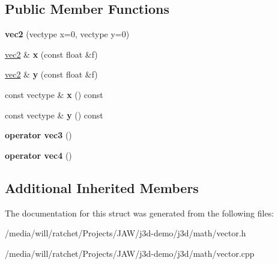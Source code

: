 \subsection*{Public Member Functions}
\begin{DoxyCompactItemize}
\item 
\hypertarget{structj3d_1_1vec2_ae8532d748f0c45ba9d535205c7c6b695}{}{\bfseries vec2} (vectype x=0, vectype y=0)\label{structj3d_1_1vec2_ae8532d748f0c45ba9d535205c7c6b695}

\item 
\hypertarget{structj3d_1_1vec2_a1f2c1957d2b8a6b29d866e56cae11551}{}\hyperlink{structj3d_1_1vec2}{vec2} \& {\bfseries x} (const float \&f)\label{structj3d_1_1vec2_a1f2c1957d2b8a6b29d866e56cae11551}

\item 
\hypertarget{structj3d_1_1vec2_af2b7b7337bdf7d0ed7e2a1eda2b17b0d}{}\hyperlink{structj3d_1_1vec2}{vec2} \& {\bfseries y} (const float \&f)\label{structj3d_1_1vec2_af2b7b7337bdf7d0ed7e2a1eda2b17b0d}

\item 
\hypertarget{structj3d_1_1vec2_ae1d8cd2a732b0b452ea4ffb43d15e3f1}{}const vectype \& {\bfseries x} () const \label{structj3d_1_1vec2_ae1d8cd2a732b0b452ea4ffb43d15e3f1}

\item 
\hypertarget{structj3d_1_1vec2_a6121dc1f7b29bc995a82eef739c29793}{}const vectype \& {\bfseries y} () const \label{structj3d_1_1vec2_a6121dc1f7b29bc995a82eef739c29793}

\item 
\hypertarget{structj3d_1_1vec2_a4d3d3d89250edda8cd6459a2d5718afd}{}{\bfseries operator vec3} ()\label{structj3d_1_1vec2_a4d3d3d89250edda8cd6459a2d5718afd}

\item 
\hypertarget{structj3d_1_1vec2_ac149f2e568a4618bf29162b3ad79ad13}{}{\bfseries operator vec4} ()\label{structj3d_1_1vec2_ac149f2e568a4618bf29162b3ad79ad13}

\end{DoxyCompactItemize}
\subsection*{Additional Inherited Members}


The documentation for this struct was generated from the following files\+:\begin{DoxyCompactItemize}
\item 
/media/will/ratchet/\+Projects/\+J\+A\+W/j3d-\/demo/j3d/math/vector.\+h\item 
/media/will/ratchet/\+Projects/\+J\+A\+W/j3d-\/demo/j3d/math/vector.\+cpp\end{DoxyCompactItemize}
